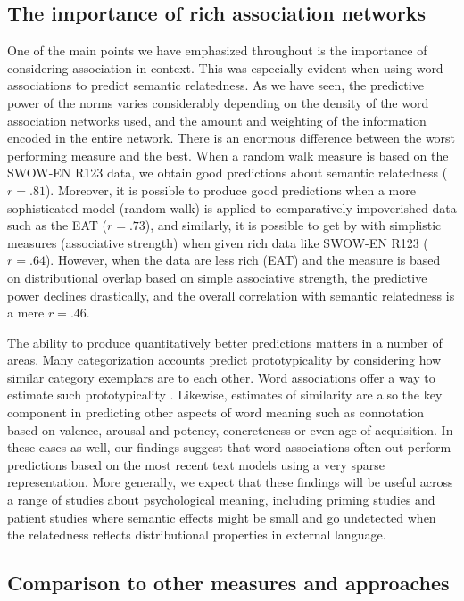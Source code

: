 \documentclass[a4paper,doc,natbib,floatsintext]{apa6}
\begin{document}
\subsection{The importance of rich association networks}

One of the main points we have emphasized throughout is the importance of considering association in context. This was especially evident when using word associations to predict semantic relatedness. As we have seen, the predictive power of the norms varies considerably depending on the density of the word association networks used, and the amount and weighting of the information encoded in the entire network. There is an enormous difference between the worst performing measure and the best. When a random walk measure is based on the SWOW-EN R123 data, we obtain good predictions about semantic relatedness ($r=.81$). Moreover, it is possible to produce good predictions when a more sophisticated model (random walk) is applied to comparatively impoverished data such as the EAT ($r=.73$), and similarly, it is possible to get by with simplistic measures (associative strength) when given rich data like SWOW-EN R123 ($r=.64$). However, when the data are less rich (EAT) and the measure is based on distributional overlap based on simple associative strength, the predictive power declines drastically, and the overall correlation with semantic relatedness is a mere $r = .46$.

The ability to produce quantitatively better predictions matters in a number of areas.
Many categorization accounts predict prototypicality by considering how similar category exemplars are to each other. Word associations offer a way to estimate such prototypicality \citep{DeDeyne2008}. Likewise, estimates of similarity are also the key component in predicting other aspects of word meaning such as connotation based on valence, arousal and potency, concreteness or even age-of-acquisition. In these cases as well, our findings suggest that word associations often out-perform predictions based on the most recent text models \citep{DeDeyne2016ACL,VanRensbergen2016,Vankrunkelsven2018} using a very sparse representation.
More generally, we expect that these findings will be useful across a range of studies about psychological meaning, including priming studies and patient studies where semantic effects might be small and go undetected when the relatedness reflects distributional properties in external language.



\subsection{Comparison to other measures and approaches}
\end{document}
